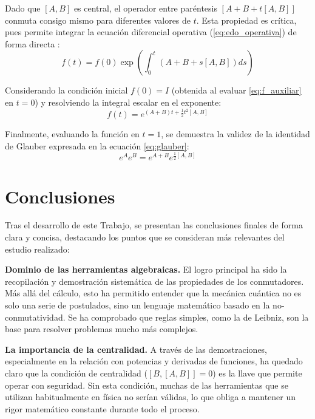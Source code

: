 \documentclass[11pt,a4paper,spanish]{book}
\begin{document}
Dado que $[A, B]$ es central, el operador entre paréntesis $[A + B + t[A, B]]$ conmuta consigo mismo para diferentes valores de $t$. Esta propiedad es crítica, pues permite integrar la ecuación diferencial operativa (\ref{eq:edo_operativa}) de forma directa \citep{wilcox1967, messiah1961}:
\begin{equation}
  f(t) = f(0) \exp \left( \int_{0}^{t} (A + B + s[A, B]) ds \right) 
\end{equation}

Considerando la condición inicial $f(0) = I$ (obtenida al evaluar \ref{eq:f_auxiliar} en $t=0$) y resolviendo la integral escalar en el exponente:
\begin{equation}
  f(t) = e^{(A + B)t + \frac{1}{2}t^2[A, B]}
\end{equation}

Finalmente, evaluando la función en $t=1$, se demuestra la validez de la identidad de Glauber expresada en la ecuación \ref{eq:glauber}:
\begin{equation}
e^A e^B = e^{A+B} e^{\frac{1}{2}[A, B]}
\end{equation}

\chapter{Conclusiones}

Tras el desarrollo de este Trabajo, se presentan las conclusiones finales de forma clara y concisa, destacando los puntos que se consideran más relevantes del estudio realizado:

\textbf{Dominio de las herramientas algebraicas.} 
El logro principal ha sido la recopilación y demostración sistemática de las propiedades de los conmutadores. Más allá del cálculo, esto ha permitido entender que la mecánica cuántica no es solo una serie de postulados, sino un lenguaje matemático basado en la no-conmutatividad. Se ha comprobado que reglas simples, como la de Leibniz, son la base para resolver problemas mucho más complejos.

\textbf{La importancia de la centralidad.} 
A través de las demostraciones, especialmente en la relación con potencias y derivadas de funciones, ha quedado claro que la condición de centralidad ($[B, [A, B]] = 0$) es la llave que permite operar con seguridad. Sin esta condición, muchas de las herramientas que se utilizan habitualmente en física no serían válidas, lo que obliga a mantener un rigor matemático constante durante todo el proceso.
\end{document}
